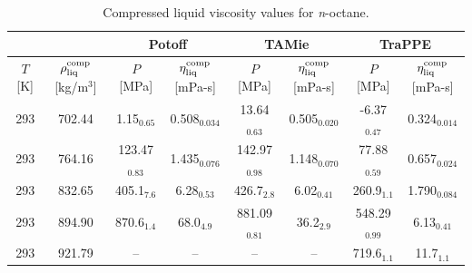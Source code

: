 \documentclass[preprint,review,11pt]{elsarticle}
\begin{document}
\begin{landscape}
	\begin{table}[H]
		\caption{Compressed liquid viscosity values for \textit{n}-octane.}
		\begin{center}
			\begin{tabular}{|c|c|c|c|c|c|c|c|}
				\hline
				&                  & \multicolumn{2}{c|}{Potoff}     & \multicolumn{2}{c|}{TAMie}      & \multicolumn{2}{c|}{TraPPE}    \\ \hline
				$T$ {[}K{]} & $\rho^{\rm comp}_{\rm liq}$ {[}kg/m$^3${]} & $P$ {[}MPa{]}    & $\eta^{\rm comp}_{\rm liq}$ {[}mPa-s{]} & $P$ {[}MPa{]}    & $\eta^{\rm comp}_{\rm liq}$ {[}mPa-s{]} & $P$ {[}MPa{]}   & $\eta^{\rm comp}_{\rm liq}$ {[}mPa-s{]} \\ \hline
				293 & 702.44 & 1.15$_{0.65}$   & 0.508$_{0.034}$ & 13.64$_{0.63}$  & 0.505$_{0.020}$ & -6.37$_{0.47}$  & 0.324$_{0.014}$ \\ \hline
				293 & 764.16 & 123.47$_{0.83}$ & 1.435$_{0.076}$ & 142.97$_{0.98}$ & 1.148$_{0.070}$ & 77.88$_{0.59}$  & 0.657$_{0.024}$ \\ \hline
				293 & 832.65 & 405.1$_{7.6}$   & 6.28$_{0.53}$   & 426.7$_{2.8}$   & 6.02$_{0.41}$   & 260.9$_{1.1}$   & 1.790$_{0.084}$ \\ \hline
				293 & 894.90 & 870.6$_{1.4}$   & 68.0$_{4.9}$    & 881.09$_{0.81}$ & 36.2$_{2.9}$    & 548.29$_{0.99}$ & 6.13$_{0.41}$   \\ \hline
				293 & 921.79 & --               & --               & --               & --               & 719.6$_{1.1}$   & 11.7$_{1.1}$    \\ \hline
			\end{tabular}
		\end{center}
	\end{table}



\end{landscape}
\end{document}
